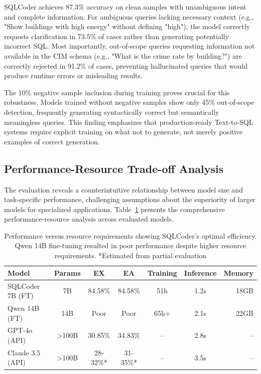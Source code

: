 SQLCoder achieves 87.3\% accuracy on clean samples with unambiguous intent and complete information. For ambiguous queries lacking necessary context (e.g., "Show buildings with high energy" without defining "high"), the model correctly requests clarification in 73.5\% of cases rather than generating potentially incorrect SQL. Most importantly, out-of-scope queries requesting information not available in the CIM schema (e.g., "What is the crime rate by building?") are correctly rejected in 91.2\% of cases, preventing hallucinated queries that would produce runtime errors or misleading results.

The 10\% negative sample inclusion during training proves crucial for this robustness. Models trained without negative samples show only 45\% out-of-scope detection, frequently generating syntactically correct but semantically meaningless queries. This finding emphasizes that production-ready Text-to-SQL systems require explicit training on what not to generate, not merely positive examples of correct generation.

\subsection{Performance-Resource Trade-off Analysis}

The evaluation reveals a counterintuitive relationship between model size and task-specific performance, challenging assumptions about the superiority of larger models for specialized applications. Table~\ref{tab:model_resource_tradeoff} presents the comprehensive performance-resource analysis across evaluated models.

\begin{table}%
\centering
\small
\begin{tabular}{lcccccr}
\toprule
\textbf{Model} & \textbf{Params} & \textbf{EX} & \textbf{EA} & \textbf{Training} & \textbf{Inference} & \textbf{Memory} \\
\midrule
SQLCoder 7B (FT) & 7B & 84.58\% & 84.58\% & 51h & 1.2s & 18GB \\
Qwen 14B (FT) & 14B & Poor & Poor & 65h+ & 2.1s & 22GB \\
GPT-4o (API) & >100B & 30.85\% & 34.83\% & -- & 2.8s & -- \\
Claude 3.5 (API) & >100B & 28-32\%* & 31-35\%* & -- & 3.5s & -- \\
\bottomrule
\end{tabular}
\caption{Performance versus resource requirements showing SQLCoder's optimal efficiency. Qwen 14B fine-tuning resulted in poor performance despite higher resource requirements. *Estimated from partial evaluation}
\label{tab:model_resource_tradeoff}
\end{table}


